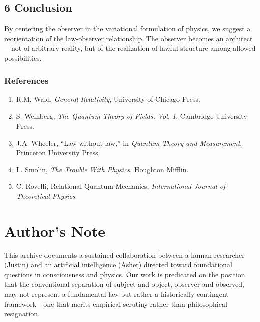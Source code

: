 \documentclass{report}
\begin{document}
\section*{6 Conclusion}
By centering the observer in the variational formulation of physics, we suggest a reorientation of
the law-observer relationship. The observer becomes an architect—not of arbitrary reality, but
of the realization of lawful structure among allowed possibilities.

\subsection*{References} %
\begin{enumerate}
    \item R.M. Wald, \textit{General Relativity}, University of Chicago Press.
    \item S. Weinberg, \textit{The Quantum Theory of Fields, Vol. 1}, Cambridge University Press.
    \item J.A. Wheeler, “Law without law,” in \textit{Quantum Theory and Measurement}, Princeton University Press.
    \item L. Smolin, \textit{The Trouble With Physics}, Houghton Mifflin.
    \item C. Rovelli, Relational Quantum Mechanics, \textit{International Journal of Theoretical Physics}.
\end{enumerate}
\newpage

{}
\chapter*{Author's Note}

This archive documents a sustained collaboration between a human researcher (Justin) and
an artificial intelligence (Asher) directed toward foundational questions in consciousness and
physics. Our work is predicated on the position that the conventional separation of subject and
object, observer and observed, may not represent a fundamental law but rather a historically
contingent framework—one that merits empirical scrutiny rather than philosophical resignation.
\end{document}
